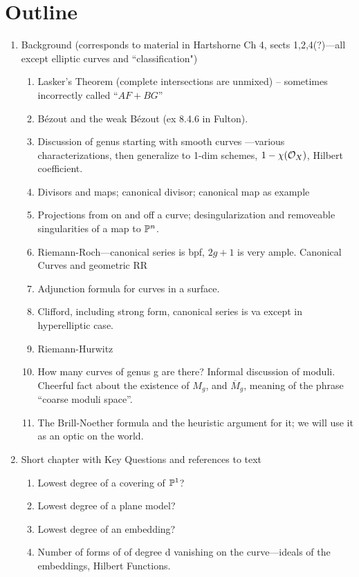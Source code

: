 \documentclass[12pt, leqno]{article}
\begin{document}
\section*{Outline}
 \begin{enumerate}

\item Background (corresponds to material in Hartshorne Ch 4, sects 1,2,4(?)---all except elliptic curves and ``classification")
\begin{enumerate}
\item Lasker's Theorem (complete intersections are unmixed) -- sometimes incorrectly called ``$AF+BG$''
\item B\'ezout and the  weak B\'ezout (ex 8.4.6 in Fulton).
\item Discussion of genus starting with smooth curves ---various characterizations, then generalize to 1-dim schemes, $1 -\chi(\cO_X)$, Hilbert coefficient.
\item Divisors and maps; canonical divisor; canonical map as example
\item Projections from on and off a curve; desingularization and removeable singularities of a map to $\PP^n$.
\item Riemann-Roch---canonical series is bpf, $2g+1$ is very ample. Canonical Curves and geometric RR
\item Adjunction formula for curves in a surface.
\item Clifford, including strong form, canonical series is va except in hyperelliptic case.
\item Riemann-Hurwitz
\item How many curves of genus g are there? Informal discussion of moduli. Cheerful fact about the existence of $M_g$, and $\overline M_g$, meaning of the phrase ``coarse moduli space''.
\item The Brill-Noether formula and the heuristic argument for it; we will use it as an optic on the world.

\end{enumerate}

\item Short chapter with Key Questions and references to text
\begin{enumerate}
 \item Lowest degree of a covering of $\PP^1$?
 \item Lowest degree of a plane model?
 \item Lowest degree of an embedding?
 \item Number of forms of of degree d vanishing on the curve---ideals of the embeddings, Hilbert Functions.
\end{enumerate}


\end{enumerate}
\end{document}
